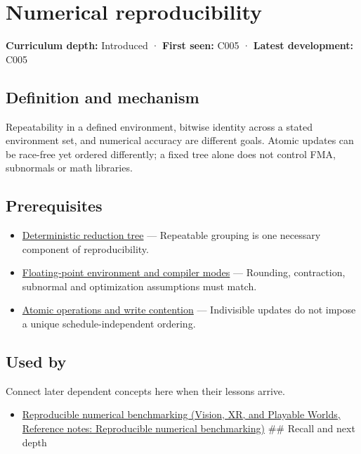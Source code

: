 \hypertarget{appendix-5f1a2c3f97ff}{}\label{referencestart:appendix-5f1a2c3f97ff}
\section{Numerical reproducibility}\label{appendix-5f1a2c3f97ff-numerical-reproducibility}

\textbf{Curriculum depth:} Introduced · \textbf{First seen:} C005 · \textbf{Latest development:} C005

\subsection{Definition and mechanism}\label{appendix-5f1a2c3f97ff-definition-and-mechanism}

Repeatability in a defined environment, bitwise identity across a stated environment set, and numerical accuracy are different goals. Atomic updates can be race-free yet ordered differently; a fixed tree alone does not control FMA, subnormals or math libraries.

\subsection{Prerequisites}\label{appendix-5f1a2c3f97ff-prerequisites}

\begin{itemize}
\tightlist
\item
  \hyperref[appendix-4c8e0238e7ee]{Deterministic reduction tree} --- Repeatable grouping is one necessary component of reproducibility.
\item
  \hyperref[appendix-f11d1a521253]{Floating-point environment and compiler modes} --- Rounding, contraction, subnormal and optimization assumptions must match.
\item
  \hyperref[appendix-e12d1b03fefb]{Atomic operations and write contention} --- Indivisible updates do not impose a unique schedule-independent ordering.
\end{itemize}

\subsection{Used by}\label{appendix-5f1a2c3f97ff-used-by}

Connect later dependent concepts here when their lessons arrive.

\begin{itemize}
\tightlist
\item
  \href{../07-Vision-XR-and-Playable-Worlds/main.pdf\#nameddest=appendix-b9db93e28371}{Reproducible numerical benchmarking (Vision, XR, and Playable Worlds, Reference notes: Reproducible numerical benchmarking)} \#\# Recall and next depth
\end{itemize}

